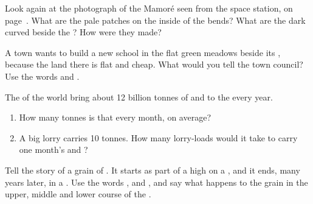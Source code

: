 \begin{exercise}[$\star\star$]\label{exo:g5:water-shapes-the-land:8}
Look again at the photograph of the Mamoré  seen from the space
station, on page~\pageref{fig:g5:water-shapes-the-land:mamore}. What are the pale patches on the inside of the
bends? What are the dark curved  beside the ? How were they made?
\end{exercise}

\begin{exercise}[$\star\star$]\label{exo:g5:water-shapes-the-land:9}
A town wants to build a new school in the flat green meadows beside its
, because the land there is flat and cheap. What would you tell the
town council? Use the words \emph{} and \emph{}.
\end{exercise}

\begin{exercise}[$\star\star$]\label{exo:g5:water-shapes-the-land:10}
The  of the world bring about 12 billion tonnes of  and  to
the  every year.
\begin{enumerate}
  \item[(a)] How many tonnes is that every month, on average?
  \item[(b)] A big lorry carries 10 tonnes. How many lorry-loads would it
        take to carry one month's  and ?
\end{enumerate}
\end{exercise}

\begin{exercise}[$\star\star\star$]\label{exo:g5:water-shapes-the-land:11}
Tell the story of a grain of . It starts as part of a  high on a
, and it ends, many years later, in a . Use the words
\emph{}, \emph{} and \emph{}, and say what
happens to the grain in the upper, middle and lower course of the .
\end{exercise}
